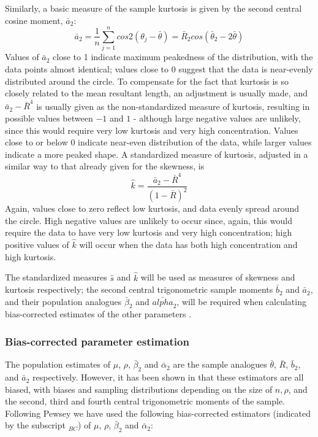 \documentclass[../../ArchStats.tex]{subfiles}
\begin{document}
Similarly, a basic measure of the sample kurtosis is given by the second central cosine moment, $\bar{a}_2$:
\[ \bar{a}_2 = \frac{1}{n} \sum_{j=1}^n cos 2(\theta_j-\bar{\theta}) = \bar{R}_2 cos(\bar{\theta}_2 - 2\bar{\theta}) \]
Values of $\bar{a}_2$ close to 1 indicate maximum peakedness of the distribution, with the data points almost identical; values close to 0 suggest that the data is near-evenly distributed around the circle. To compensate for the fact that kurtosis is so closely related to the mean resultant length, an adjustment is usually made, and $\bar{a}_2 - \bar{R}^4$ is usually given as the non-standardized measure of kurtosis, resulting in possible values between $-1$ and $1$ - although large negative values are unlikely, since this would require very low kurtosis and very high concentration. Values close to or below 0 indicate near-even distribution of the data, while larger values indicate a more peaked shape. A standardized measure of kurtosis, adjusted in a similar way to that already given for the skewness, is
\[ \hat{k} = \frac{\bar{a}_2 - \bar{R}^4}{(1-\bar{R})^2}\]
Again, values close to zero reflect low kurtosis, and data evenly spread around the circle. High negative values are unlikely to occur since, again, this would require the data to have very low kurtosis and very high concentration; high positive values of $\hat{k}$ will occur when the data has both high concentration and high kurtosis.

The standardized measures $\hat{s}$ and $\hat{k}$ will be used as measures of skewness and kurtosis respectively; the second central trigonometric sample moments $\bar{b}_2$ and $\bar{a}_2$, and their population analogues $\bar{\beta}_2$ and $\bar{alpha}_2$, will be required when calculating bias-corrected estimates of the other parameters .


\subsubsection{Bias-corrected parameter estimation}
\label{sec:bias-corrected}
The population estimates of $\mu$, $\rho$, $\bar{\beta}_2$ and $\bar{\alpha}_2$ are the sample analogues $\bar{\theta}$, $\bar{R}$, $\bar{b}_2$, and $\bar{a}_2$ respectively. However, it has been shown in \cite{Pewsey2004b} that these estimators are all biased, with biases and sampling distributions depending on the size of $n, \rho$, and the second, third and fourth central trigonometric moments of the sample. Following Pewsey \cite{Pewsey2014} we have used the following bias-corrected estimators (indicated by the subscript $_{BC}$) of $\mu$, $\rho$, $\bar{\beta}_2$ and $\bar{\alpha}_2$:
\end{document}
